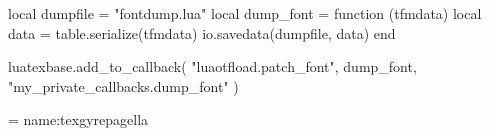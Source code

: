


\directlua
 {
   local dumpfile = "fontdump.lua"
   local dump_font =
    function (tfmdata)
     local data = table.serialize(tfmdata)
     io.savedata(dumpfile, data)
    end

  luatexbase.add_to_callback(
     "luaotfload.patch_font",
     dump_font,
     "my_private_callbacks.dump_font"
    )
 }

\font \dumpme  = {name:texgyrepagella}
\bye 